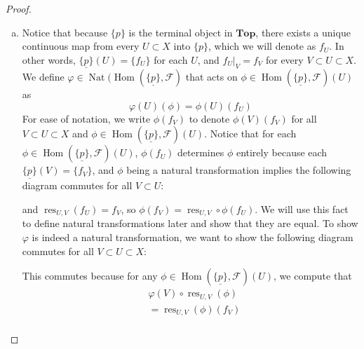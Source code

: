 \documentclass{article}
\newcommand{\fF}{\mathscr{F}}
\newcommand{\Top}{\mathbf{Top}} %
\DeclareMathOperator{\res}{\mathrm{res}}
\DeclareMathOperator{\Hom}{\mathrm{Hom}}
\DeclareMathOperator{\Nat}{\mathrm{Nat}}
\begin{document}
\begin{proof}
    \begin{enumerate}[(a)]
        \item Notice that because $\{p\}$ is the terminal object in $\Top$, there exists a unique continuous map from every $U\subset X$ into $\{p\}$, which we will denote as $f_U$. In other words, $\underline{\{p\}}(U)=\{f_U\}$ for each $U$, and $f_U\vert_{V}=f_V$ for every $V\subset U\subset X$. We define $\varphi\in \Nat(\Hom(\underline{\{p\}},\fF)$ that acts on $\phi \in \Hom(\underline{\{p\}},\fF)(U)$ as 
        \[
        \varphi(U)(\phi)=\phi(U)(f_U)
        \]
        For ease of notation, we write $\phi(f_V)$ to denote $\phi(V)(f_V)$ for all $V\subset U\subset X$ and $\phi\in \Hom(\underline{\{p\}},\fF)(U)$. Notice that for each $\phi \in \Hom(\underline{\{p\}},\fF)(U)$, $\phi(f_U)$ determines $\phi$ entirely because each $\underline{\{p\}}(V)=\{f_V\}$, and $\phi$ being a natural transformation implies the following diagram commutes for all $V\subset U$:
        \begin{center}
        \end{center}
        and $\res_{U,V}(f_U)=f_V$, so $\phi(f_V)=\res_{U,V}\circ \phi(f_U)$. We will use this fact to define natural transformations later and show that they are equal. To show $\varphi$ is indeed a natural transformation, we want to show the following diagram commutes for all $V\subset U\subset X$:
        \begin{center}
        \end{center}
        This commutes because for any $\phi\in \Hom(\underline{\{p\}},\fF)(U)$, we compute that
        \begin{align*}
            &\varphi(V)\circ \res_{U,V}(\phi)\\
            &= \res_{U,V}(\phi)(f_V)\\

\end{align*}
\end{enumerate}
\end{proof}
\end{document}
